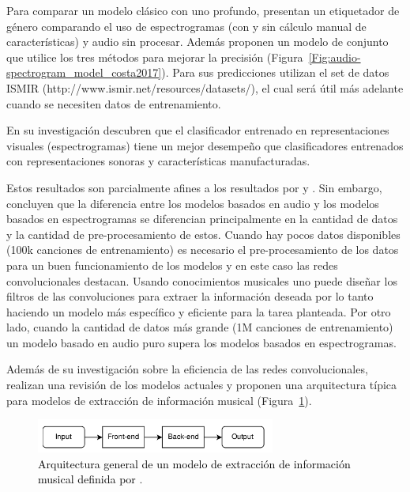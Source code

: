 Para comparar un modelo clásico con uno profundo, \cite{MGCosta:softcomputing:2017} presentan un etiquetador de género  comparando el uso de espectrogramas (con y sin cálculo manual de características) y audio sin procesar. Además proponen un modelo de conjunto que utilice los tres métodos para mejorar la precisión (Figura~\ref{Fig:audio-spectrogram_model_costa2017}). Para sus predicciones utilizan el set de datos ISMIR (http://www.ismir.net/resources/datasets/), el cual será útil más adelante cuando se necesiten datos de entrenamiento.

En su investigación descubren que el clasificador entrenado en representaciones visuales (espectrogramas) tiene un mejor desempeño que clasificadores entrenados con representaciones sonoras y características manufacturadas.

Estos resultados son parcialmente afines a los resultados por \cite{pons:end2end:2018} y \cite{Lee:2009}. Sin embargo, \cite{pons:end2end:2018} concluyen que la diferencia entre los modelos basados en audio y los modelos basados en espectrogramas se diferencian principalmente en la cantidad de datos y la cantidad de pre-procesamiento de estos. Cuando hay pocos datos disponibles (100k canciones de entrenamiento) es necesario el pre-procesamiento de los datos para un buen funcionamiento de los modelos y en este caso las redes convolucionales destacan. Usando conocimientos musicales uno puede diseñar los filtros de las convoluciones para extraer la información deseada por lo tanto haciendo un modelo más específico y eficiente para la tarea planteada. Por otro lado, cuando la cantidad de datos más grande (1M canciones de entrenamiento) un modelo basado en audio puro supera los modelos basados en espectrogramas.

Además de su investigación sobre la eficiencia de las redes convolucionales, \cite{pons:end2end:2018} realizan una revisión de los modelos actuales y proponen una arquitectura típica para modelos de extracción de información musical (Figura~\ref{Fig:deeplearningpipeline_pons2018}).

\begin{figure}[htb]
  \centering
  \includegraphics[width=0.7\textwidth]{Figures/deeplearningpipeline_pons2018.png}
  \caption{\textcolor{black}{Arquitectura general de un modelo de extracción de información musical definida por \cite{pons:end2end:2018}}.}
  \label{Fig:deeplearningpipeline_pons2018}
\end{figure}

